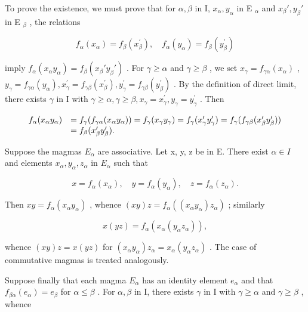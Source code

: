 To prove the existence, we must prove that for \(\alpha, \beta\) in I, \(x_{\alpha}, y_{\alpha}\) in E \(_{\alpha}\) and \(x_{\beta}', y_{\beta}'\) in E \(_{\beta}\) , the relations

\[
f _ {\alpha} (x _ {\alpha}) = f _ {\beta} (x _ {\beta} ^ {\prime}), \quad f _ {\alpha} (y _ {\alpha}) = f _ {\beta} (y _ {\beta} ^ {\prime})\tag{5}
\]

imply \(f_{\alpha}(x_{\alpha}y_{\alpha}) = f_{\beta}(x_{\beta}'y_{\beta}')\) . For \(\gamma \geqslant \alpha\) and \(\gamma \geqslant \beta\) , we set \(x_{\gamma} = f_{\gamma \alpha}(x_{\alpha})\) , \(y_{\gamma} = f_{\gamma \alpha}(y_{\alpha}), x_{\gamma}^{\prime} = f_{\gamma \beta}(x_{\beta}^{\prime}), y_{\gamma}^{\prime} = f_{\gamma \beta}(y_{\beta}^{\prime})\) . By the definition of direct limit, there exists \(\gamma\) in I with \(\gamma \geqslant \alpha, \gamma \geqslant \beta, x_{\gamma} = x_{\gamma}^{\prime}, y_{\gamma} = y_{\gamma}^{\prime}\) . Then

\[
\begin{array}{r l} f _ {\alpha} (x _ {\alpha} y _ {\alpha}) & = f _ {\gamma} (f _ {\gamma \alpha} (x _ {\alpha} y _ {\alpha})) = f _ {\gamma} (x _ {\gamma} y _ {\gamma}) = f _ {\gamma} (x _ {\gamma} ^ {\prime} y _ {\gamma} ^ {\prime}) = f _ {\gamma} (f _ {\gamma \beta} (x _ {\beta} ^ {\prime} y _ {\beta} ^ {\prime})) \\ & = f _ {\beta} (x _ {\beta} ^ {\prime} y _ {\beta} ^ {\prime}). \end{array}
\]

Suppose the magmas \(E_{\alpha}\) are associative. Let x, y, z be in E. There exist \(\alpha \in I\) and elements \(x_{\alpha}, y_{\alpha}, z_{\alpha}\) in \(E_{\alpha}\) such that

\[
x = f _ {\alpha} (x _ {\alpha}), \quad y = f _ {\alpha} (y _ {\alpha}), \quad z = f _ {\alpha} (z _ {\alpha}).
\]

Then \(xy = f_{\alpha}(x_{\alpha}y_{\alpha})\) , whence \((xy)z = f_{\alpha}((x_{\alpha}y_{\alpha})z_{\alpha})\) ; similarly

\[
x (y z) = f _ {\alpha} \left(x _ {\alpha} \left(y _ {\alpha} z _ {\alpha}\right)\right),
\]

whence \((xy)z = x(yz)\) for \((x_{\alpha}y_{\alpha})z_{\alpha} = x_{\alpha}(y_{\alpha}z_{\alpha})\) . The case of commutative magmas is treated analogously.

Suppose finally that each magma \(E_{\alpha}\) has an identity element \(e_{\alpha}\) and that \(f_{\beta\alpha}(e_{\alpha}) = e_{\beta}\) for \(\alpha \leqslant \beta\) . For \(\alpha, \beta\) in I, there exists \(\gamma\) in I with \(\gamma \geqslant \alpha\) and \(\gamma \geqslant \beta\) , whence

